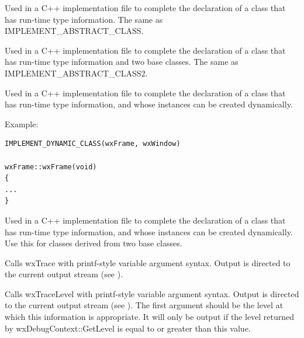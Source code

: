 
Used in a C++ implementation file to complete the declaration of
a class that has run-time type information. The same as IMPLEMENT\_ABSTRACT\_CLASS.



Used in a C++ implementation file to complete the declaration of a
class that has run-time type information and two base classes. The
same as IMPLEMENT\_ABSTRACT\_CLASS2.



Used in a C++ implementation file to complete the declaration of
a class that has run-time type information, and whose instances
can be created dynamically.

Example:

\begin{verbatim}
IMPLEMENT_DYNAMIC_CLASS(wxFrame, wxWindow)

wxFrame::wxFrame(void)
{
...
}
\end{verbatim}



Used in a C++ implementation file to complete the declaration of
a class that has run-time type information, and whose instances
can be created dynamically. Use this for classes derived from two
base classes.

\label{trace}


Calls wxTrace with printf-style variable argument syntax. Output
is directed to the current output stream (see ).

\label{tracelevel}


Calls wxTraceLevel with printf-style variable argument syntax. Output
is directed to the current output stream (see ).
The first argument should be the level at which this information is appropriate.
It will only be output if the level returned by wxDebugContext::GetLevel is equal to or greater than
this value.

